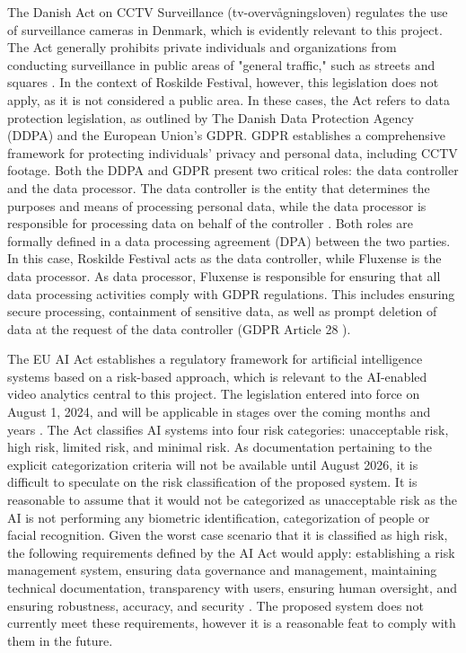 The Danish Act on CCTV Surveillance (tv-overvågningsloven) regulates the use of surveillance cameras in Denmark, which is evidently relevant to this project. The Act generally prohibits private individuals and organizations from conducting surveillance in public areas of "general traffic," such as streets and squares \cite{cctv_law}. In the context of Roskilde Festival, however, this legislation does not apply, as it is not considered a public area. In these cases, the Act refers to data protection legislation, as outlined by The Danish Data Protection Agency (DDPA) and the European Union's GDPR. GDPR establishes a comprehensive framework for protecting individuals' privacy and personal data, including CCTV footage. Both the DDPA and GDPR present two critical roles: the data controller and the data processor. The data controller is the entity that determines the purposes and means of processing personal data, while the data processor is responsible for processing data on behalf of the controller \cite{gdpr_dpa}. Both roles are formally defined in a data processing agreement (DPA) between the two parties. In this case, Roskilde Festival acts as the data controller, while Fluxense is the data processor. As data processor, Fluxense is responsible for ensuring that all data processing activities comply with GDPR regulations. This includes ensuring secure processing, containment of sensitive data, as well as prompt deletion of data at the request of the data controller (GDPR Article 28 \cite{gdpr_article_28}).

The EU AI Act establishes a regulatory framework for artificial intelligence systems based on a risk-based approach, which is relevant to the AI-enabled video analytics central to this project. The legislation entered into force on August 1, 2024, and will be applicable in stages over the coming months and years \cite{ai_act_passed}. The Act classifies AI systems into four risk categories: unacceptable risk, high risk, limited risk, and minimal risk. As documentation pertaining to the explicit categorization criteria will not be available until August 2026, it is difficult to speculate on the risk classification of the proposed system. It is reasonable to assume that it would not be categorized as unacceptable risk as the AI is not performing any biometric identification, categorization of people or facial recognition. Given the worst case scenario that it is classified as high risk, the following requirements defined by the AI Act would apply: establishing a risk management system, ensuring data governance and management, maintaining technical documentation, transparency with users, ensuring human oversight, and ensuring robustness, accuracy, and security \cite{ai_act_requirements}. The proposed system does not currently meet these requirements, however it is a reasonable feat to comply with them in the future.

